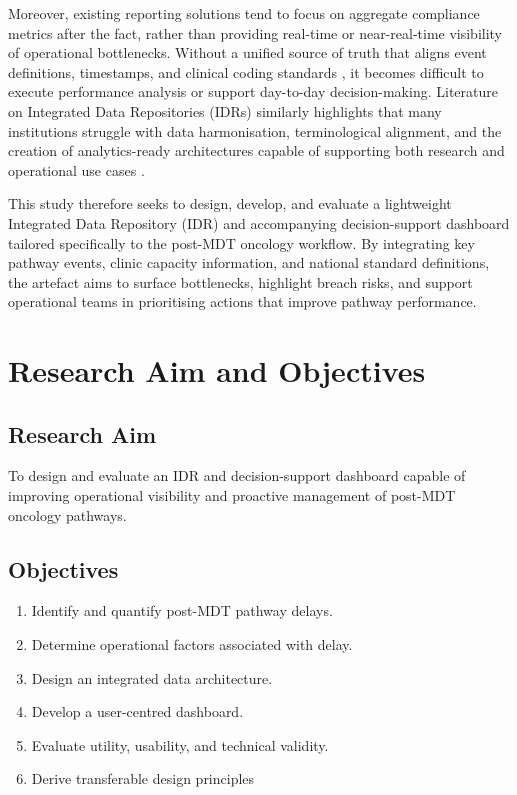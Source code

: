 Moreover, existing reporting solutions tend to focus on aggregate compliance metrics after the fact, rather than providing real-time or near-real-time visibility of operational bottlenecks. Without a unified source of truth that aligns event definitions, timestamps, and clinical coding standards \citep{NHSDigital2026}, it becomes difficult to execute performance analysis or support day-to-day decision-making. Literature on Integrated Data Repositories (IDRs) similarly highlights that many institutions struggle with data harmonisation, terminological alignment, and the creation of analytics-ready architectures capable of supporting both research and operational use cases \citep{gagalova2020}.

This study therefore seeks to design, develop, and evaluate a lightweight Integrated Data Repository (IDR) and accompanying decision-support dashboard tailored specifically to the post-MDT oncology workflow. By integrating key pathway events, clinic capacity information, and national standard definitions, the artefact aims to surface bottlenecks, highlight breach risks, and support operational teams in prioritising actions that improve pathway performance.

\section{Research Aim and Objectives}

\subsection{Research Aim}
To design and evaluate an IDR and decision-support dashboard capable of improving operational visibility and proactive management of post-MDT oncology pathways.

\subsection{Objectives}
\begin{enumerate}
    \item Identify and quantify post-MDT pathway delays.
    \item Determine operational factors associated with delay.
    \item Design an integrated data architecture.
    \item Develop a user-centred dashboard.
    \item Evaluate utility, usability, and technical validity.
    \item Derive transferable design principles
\end{enumerate}

